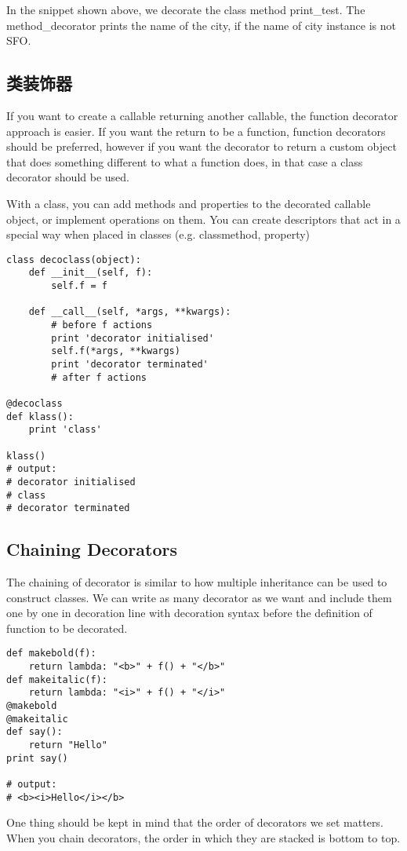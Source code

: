 \documentclass[10pt,a4paper]{ctexbook}
\begin{document}
In the snippet shown above, we decorate the class method print\_test. The method\_decorator prints the name of the city, if the name of city instance is not SFO.

\subsection{类装饰器}
If you want to create a callable returning another callable, the function decorator approach is easier. If you want the return to be a function, function decorators should be preferred, however if you want the decorator to return a custom object that does something different to what a function does, in that case a class decorator should be used.

With a class, you can add methods and properties to the decorated callable object, or implement operations on them. You can create descriptors that act in a special way when placed in classes (e.g. classmethod, property)

\begin{verbatim}
class decoclass(object):
    def __init__(self, f):
        self.f = f

    def __call__(self, *args, **kwargs):
        # before f actions
        print 'decorator initialised'
        self.f(*args, **kwargs)
        print 'decorator terminated'
        # after f actions

@decoclass
def klass():
    print 'class'

klass()
# output:
# decorator initialised
# class
# decorator terminated
\end{verbatim}

\subsection{Chaining Decorators}
The chaining of decorator is similar to how multiple inheritance can be used to construct classes. We can write as many decorator as we want and include them one by one in decoration line with decoration syntax before the definition of function to be decorated.

\begin{verbatim}
def makebold(f):
    return lambda: "<b>" + f() + "</b>"
def makeitalic(f):
    return lambda: "<i>" + f() + "</i>"
@makebold
@makeitalic
def say():
    return "Hello"
print say()

# output:
# <b><i>Hello</i></b>
\end{verbatim}
One thing should be kept in mind that the order of decorators we set matters. When you chain decorators, the order in which they are stacked is bottom to top.
\end{document}
